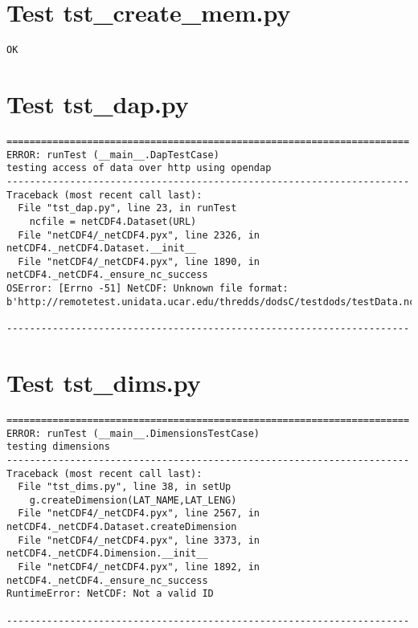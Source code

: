 \section{Test tst\_create\_mem.py}

\begin{verbatim}
OK
\end{verbatim}

\section{Test tst\_dap.py}

\begin{verbatim}
======================================================================
ERROR: runTest (__main__.DapTestCase)
testing access of data over http using opendap
----------------------------------------------------------------------
Traceback (most recent call last):
  File "tst_dap.py", line 23, in runTest
    ncfile = netCDF4.Dataset(URL)
  File "netCDF4/_netCDF4.pyx", line 2326, in netCDF4._netCDF4.Dataset.__init__
  File "netCDF4/_netCDF4.pyx", line 1890, in netCDF4._netCDF4._ensure_nc_success
OSError: [Errno -51] NetCDF: Unknown file format: b'http://remotetest.unidata.ucar.edu/thredds/dodsC/testdods/testData.nc'

----------------------------------------------------------------------

\end{verbatim}

\section{Test tst\_dims.py}

\begin{verbatim}
======================================================================
ERROR: runTest (__main__.DimensionsTestCase)
testing dimensions
----------------------------------------------------------------------
Traceback (most recent call last):
  File "tst_dims.py", line 38, in setUp
    g.createDimension(LAT_NAME,LAT_LENG)
  File "netCDF4/_netCDF4.pyx", line 2567, in netCDF4._netCDF4.Dataset.createDimension
  File "netCDF4/_netCDF4.pyx", line 3373, in netCDF4._netCDF4.Dimension.__init__
  File "netCDF4/_netCDF4.pyx", line 1892, in netCDF4._netCDF4._ensure_nc_success
RuntimeError: NetCDF: Not a valid ID

----------------------------------------------------------------------

\end{verbatim}

